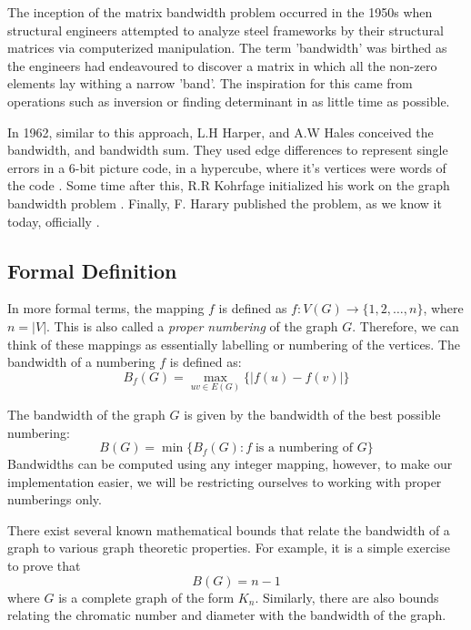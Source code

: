 \documentclass[conference,compsoc]{IEEEtran}
\begin{document}
The inception of the matrix bandwidth problem occurred in the 1950s when structural engineers 
attempted to analyze steel frameworks by their structural matrices via computerized manipulation. The term 'bandwidth' 
was birthed as the engineers had endeavoured to discover a matrix in which all the non-zero elements 
lay withing a narrow 'band'. The inspiration for this came from operations such as 
inversion or finding determinant in as little time as possible.

In 1962, similar to this approach, L.H Harper, and A.W Hales conceived the bandwidth, 
and bandwidth sum. They used edge differences to represent single errors in a 6-bit picture code, 
in a hypercube, where it's vertices were words of the code \cite{10.2307/2946514}. Some time after this, 
R.R Kohrfage initialized his work on the graph bandwidth problem \cite{ccdg1982}. Finally, F. Harary 
published the problem, as we know it today, officially \cite{https://doi.org/10.1002/bimj.19660080427}.

\subsection{Formal Definition} \label{intro}
In more formal terms, 
the mapping $f$ is defined as $f: V(G) \to \{1, 2, \dots, n\}$, where $n = |V|$. This is also called 
a \emph{proper numbering} of the graph $G$.\cite{Lee2016} Therefore, 
we can think of these mappings as essentially labelling or numbering of the vertices. The bandwidth of a numbering $f$
is defined as:
\begin{equation}
B_f(G) = \max_{uv \in E(G)}\{|f(u) - f(v)|\}
\end{equation}

The bandwidth of the graph $G$ is given by the bandwidth of the best possible numbering:
\begin{equation}
  B(G) = \min \{B_f(G): f \; \text{is a numbering of }  G\}
\end{equation}
Bandwidths can be computed using any integer mapping, however, to make our implementation 
easier, we will be restricting ourselves to working with proper numberings only.

There exist several known mathematical bounds that relate the bandwidth of a graph 
to various graph theoretic properties. For example, it is a simple exercise to prove that 
\[B(G) = n - 1\] where $G$ is a complete graph of the form $K_n$. Similarly, there are also bounds 
relating the chromatic number and diameter with the bandwidth of the graph.  \cite{ccdg1982}
\end{document}
